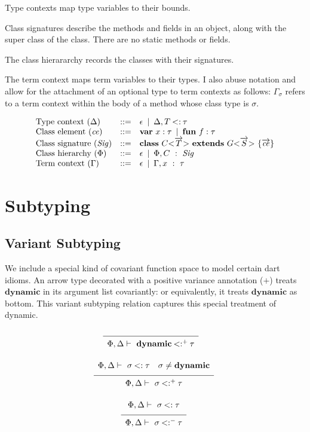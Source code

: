 \documentclass[fleqn, draft]{article}
\makeatletter
\newcommand{\Dynamic}{\mathbf{dynamic}}
\newcommand{\TApp}[2]{#1\mathrm{<}#2\mathrm{>}}
\newcommand{\kwclass}{\kw{class}}
\newcommand{\kwextends}{\kw{extends}}
\newcommand{\kwfun}{\kw{fun}}
\newcommand{\kwvar}{\kw{var}}
\newcommand{\dclass}[3]{\kwclass\ #1\ \kwextends\ #2\ \{#3\}}
\newcommand{\fieldDecl}[2]{\kwvar\ #1 : #2}
\newcommand{\methodDecl}[2]{\kwfun\ #1 : #2}
\newcommand{\sub}{\mathbin{<:}}
\newcommand{\many}[1]{\overrightarrow{#1}}
\newcommand{\alt}{\ \mathop{|}\ }
\newcommand{\infrulem}[3][]{
  \begin{array}{c@{\ }c}
    \begin{array}{cccc}
      #2 \vspace{-2mm} 
    \end{array} \\
    \hrulefill & #1 \\
    \begin{array}{l}
      #3
    \end{array}
  \end{array}
  }
\newcommand{\axiomm}[2][]{
  \begin{array}{cc}
    \hrulefill & #1 \\
    \begin{array}{c}
      #2
    \end{array}
  \end{array}
  }
\newcommand{\infrule}[3][]{
  \[ 
  \infrulem[#1]{#2}{#3}
  \]
  }
\newcommand{\axiom}[2][]{
  \[ 
  \axiomm[#1]{#2}
  \]
  }
\newcommand{\subtypeOf}[4][]{#2 \vdash\ #3 \sub^{#1} #4}
\makeatother
\begin{document}
Type contexts map type variables to their bounds.

Class signatures describe the methods and fields in an object, along with the
super class of the class.  There are no static methods or fields.

The class hierararchy records the classes with their signatures.

The term context maps term variables to their types.  I also abuse notation and
allow for the attachment of an optional type to term contexts as follows:
$\Gamma_\sigma$ refers to a term context within the body of a method whose class
type is $\sigma$.

\[
\begin{array}{lcl}
\text{Type context ($\Delta$)} & ::= &  \epsilon \alt \Delta, T \sub \tau \\
\text{Class element ($\mathit{ce}$)} & ::= & 
  \fieldDecl{x}{\tau} \alt \methodDecl{f}{\tau} \\
\text{Class signature ($\mathit{Sig}$)} & ::= &
  \dclass{\TApp{C}{\many{T}}}{\TApp{G}{\many{S}}}{\many{\mathit{ce}}} \\
\text{Class hierarchy ($\Phi$)} & ::= &  \epsilon \alt \Phi, C\ :\ \mathit{Sig} \\
\text{Term context ($\Gamma$)} & ::= &  \epsilon \alt \Gamma, x\ :\ \tau
\end{array}
\]


\section*{Subtyping}

\subsection*{Variant Subtyping}

We include a special kind of covariant function space to model certain dart
idioms.  An arrow type decorated with a positive variance annotation ($+$)
treats $\Dynamic$ in its argument list covariantly: or equivalently, it treats
$\Dynamic$ as bottom.  This variant subtyping relation captures this special
treatment of dynamic.

\axiom{\subtypeOf[+]{\Phi, \Delta}{\Dynamic}{\tau}}

\infrule{\subtypeOf{\Phi, \Delta}{\sigma}{\tau} \quad \sigma \neq \Dynamic}
        {\subtypeOf[+]{\Phi, \Delta}{\sigma}{\tau}}

\infrule{\subtypeOf{\Phi, \Delta}{\sigma}{\tau}}
        {\subtypeOf[-]{\Phi, \Delta}{\sigma}{\tau}}
\end{document}
